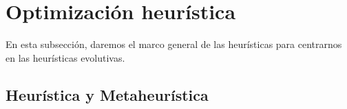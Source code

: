 \documentclass[12pt,a4paper]{book}
\begin{document}
\section{Optimización heurística} \label{Subsec: 3_3}
En esta subsección, daremos el marco general de las heurísticas para centrarnos en las heurísticas evolutivas.  

\subsection{Heurística y Metaheurística}
%
%
%
% 
%
\end{document}
